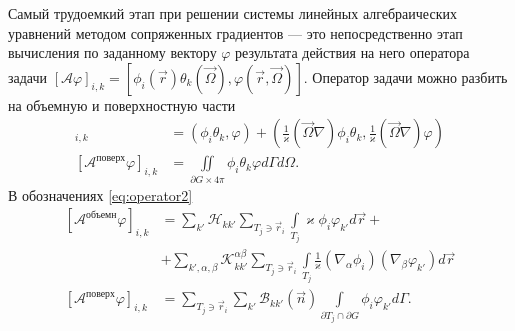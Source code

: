 Самый трудоемкий этап при решении системы линейных алгебраических уравнений методом сопряженных градиентов --- это непосредственно
этап вычисления по заданному вектору $\varphi$ результата действия на него оператора задачи
$[\mathcal{A}\varphi]_{i,k} = [\phi_i(\vec r)\theta_k(\vec \Omega), \varphi(\vec r, \vec \Omega)]$. Оператор задачи можно разбить на 
объемную и поверхностную части
\begin{align*}
[\mathcal{A}^\text{объемн} \varphi]_{i,k} &= \left(\phi_i\theta_k, \varphi\right) + 
\left(\frac{1}{\varkappa}(\vec \Omega \nabla)\phi_i\theta_k, \frac{1}{\varkappa}(\vec \Omega \nabla)\varphi\right)\\
[\mathcal{A}^\text{поверх} \varphi]_{i,k} &= \iint\limits_{\partial G \times 4\pi} \phi_i\theta_k \varphi d\Gamma d\Omega.
\end{align*}
В обозначениях \eqref{eq:operator2}
\begin{align*}\nonumber
[\mathcal{A}^\text{объемн} \varphi]_{i,k}  &= \sum_{k'} \mathscr{H}_{kk'}\sum_{T_j \ni \vec r_i}\int\limits_{T_j} \varkappa \phi_i \varphi_{k'} d\vec r +\\
&+\sum_{k',\alpha,\beta} \mathscr{K}_{kk'}^{\alpha\beta}
\sum_{T_j \ni \vec r_i}\int\limits_{T_j} \frac{1}{\varkappa} (\nabla_\alpha\phi_i)(\nabla_\beta\varphi_{k'}) d\vec r\\
[\mathcal{A}^\text{поверх} \varphi]_{i,k} &= \sum_{T_j \ni \vec r_i}
\sum_{k'}\mathscr{B}_{kk'}(\vec n)
\int\limits_{\partial T_j \cap \partial G} 
\phi_i \varphi_{k'} d\Gamma.
\end{align*}

